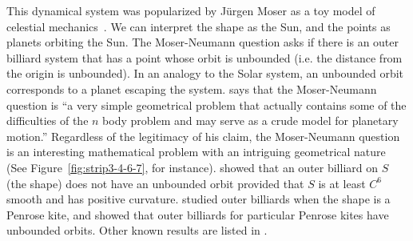 \documentclass[12pt,twoside]{book}
\begin{document}
This dynamical system was popularized by Jürgen Moser as a toy model of celestial mechanics~\citep{moser,moserbook}.
We can interpret the shape as the Sun, and the points as planets orbiting the Sun.
The Moser-Neumann question asks if there is an outer billiard system that has a point whose orbit is unbounded (i.e. the distance from the origin is unbounded).
In an analogy to the Solar system, an unbounded orbit corresponds to a planet escaping the system.
\citet{moser} says that the Moser-Neumann question is
``a very simple geometrical problem that actually contains some of the difficulties of the $n$ body problem and may serve as a crude model for planetary motion.''
Regardless of the legitimacy of his claim, the Moser-Neumann question is an interesting mathematical problem with an intriguing geometrical nature (See Figure~\ref{fig:strip3-4-6-7}, for instance).
\citet{moserbook} showed that an outer billiard on $S$ (the shape) does not have an unbounded orbit provided that $S$ is at least $C^6$ smooth and has positive curvature. 
\citet{schwartz} studied outer billiards when the shape is a Penrose kite, and showed that outer billiards for particular Penrose kites have unbounded orbits.
Other known results are listed in \citet[p. 2]{schwartz}.
\end{document}
